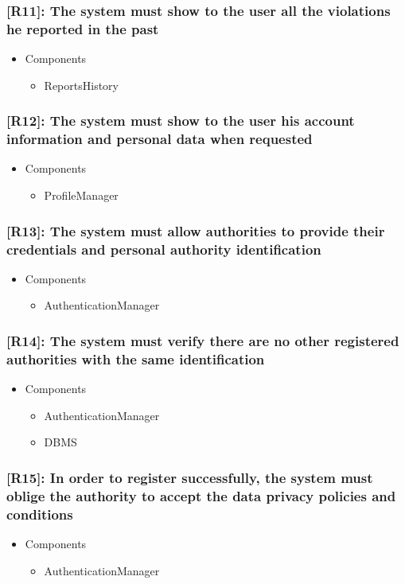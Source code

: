 \documentclass[12pt,a4paper]{article}
\begin{document}
\subsubsection*{[R11]: The system must show to the user all the violations he reported in the past}
\begin{itemize}
\item Components
\begin{itemize}
\item ReportsHistory
\end{itemize}
\end{itemize}
\subsubsection*{[R12]: The system must show to the user his account information and personal data when requested}
\begin{itemize}
\item Components
\begin{itemize}
\item ProfileManager
\end{itemize}
\end{itemize}
\subsubsection*{[R13]: The system must allow authorities to provide their credentials and personal authority identification}
\begin{itemize}
\item Components
\begin{itemize}
\item AuthenticationManager
\end{itemize}
\end{itemize}
\subsubsection*{[R14]: The system must verify there are no other registered authorities with the same identification}
\begin{itemize}
\item Components
\begin{itemize}
\item AuthenticationManager
\item DBMS
\end{itemize}
\end{itemize}
\subsubsection*{[R15]: In order to register successfully, the system must oblige the authority to accept the data privacy policies and conditions}
\begin{itemize}
\item Components
\begin{itemize}
\item AuthenticationManager
\end{itemize}
\end{itemize}
\end{document}
